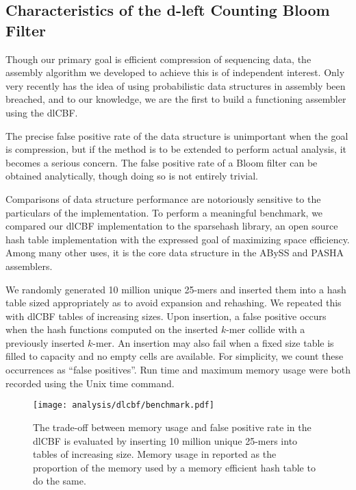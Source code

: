\documentclass[twocolumn]{article}
\begin{document}
\subsection{Characteristics of the d-left Counting Bloom Filter}

Though our primary goal is efficient compression of sequencing data, the
assembly algorithm we developed to achieve this is of independent interest.
Only very recently has the idea of using probabilistic data structures in
assembly been breached, and to our knowledge, we are the first to build
a functioning assembler using the dlCBF.

The precise false positive rate of the data structure is unimportant when the
goal is compression, but if the method is to be extended to perform actual
analysis, it becomes a serious concern. The false positive rate of a Bloom
filter can be obtained analytically, though doing so is not entirely trivial.

Comparisons of data structure performance are notoriously sensitive to the
particulars of the implementation. To perform a meaningful benchmark, we
compared our dlCBF implementation to the sparsehash library, an open source
hash table implementation with the expressed goal of maximizing space
efficiency. Among many other uses, it is the core data structure in the ABySS
\citep{Simpson2011} and PASHA \citep{Liu2011} assemblers.

We randomly generated 10 million unique 25-mers and inserted them into a hash
table sized appropriately as to avoid expansion and rehashing. We repeated
this with dlCBF tables of increasing sizes. Upon insertion, a false positive
occurs when the hash functions computed on the inserted $k$-mer collide with a
previously inserted $k$-mer. An insertion may also fail when a fixed size
table is filled to capacity and no empty cells are available. For simplicity,
we count these occurrences as ``false positives''. Run time and maximum memory
usage were both recorded using the Unix time command.

\begin{figure}[h]
\centerline{\texttt{[image: analysis/dlcbf/benchmark.pdf]}}
\caption{
The trade-off between memory usage and false positive rate in the dlCBF is
evaluated by inserting 10 million unique 25-mers into tables of increasing
size. Memory usage in reported as the proportion of the memory used by a
memory efficient hash table to do the same.
}
\label{fig:dlcbf_bench}
\end{figure}
\end{document}
